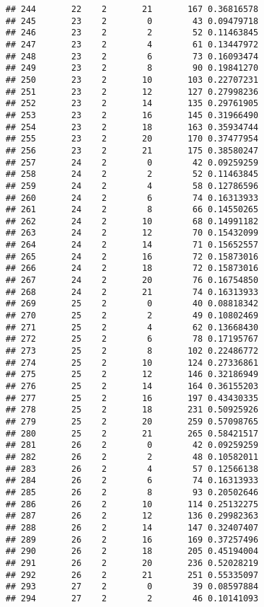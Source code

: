 \documentclass[
]{article}
\begin{document}
\begin{verbatim}
## 244       22    2       21       167 0.36816578
## 245       23    2        0        43 0.09479718
## 246       23    2        2        52 0.11463845
## 247       23    2        4        61 0.13447972
## 248       23    2        6        73 0.16093474
## 249       23    2        8        90 0.19841270
## 250       23    2       10       103 0.22707231
## 251       23    2       12       127 0.27998236
## 252       23    2       14       135 0.29761905
## 253       23    2       16       145 0.31966490
## 254       23    2       18       163 0.35934744
## 255       23    2       20       170 0.37477954
## 256       23    2       21       175 0.38580247
## 257       24    2        0        42 0.09259259
## 258       24    2        2        52 0.11463845
## 259       24    2        4        58 0.12786596
## 260       24    2        6        74 0.16313933
## 261       24    2        8        66 0.14550265
## 262       24    2       10        68 0.14991182
## 263       24    2       12        70 0.15432099
## 264       24    2       14        71 0.15652557
## 265       24    2       16        72 0.15873016
## 266       24    2       18        72 0.15873016
## 267       24    2       20        76 0.16754850
## 268       24    2       21        74 0.16313933
## 269       25    2        0        40 0.08818342
## 270       25    2        2        49 0.10802469
## 271       25    2        4        62 0.13668430
## 272       25    2        6        78 0.17195767
## 273       25    2        8       102 0.22486772
## 274       25    2       10       124 0.27336861
## 275       25    2       12       146 0.32186949
## 276       25    2       14       164 0.36155203
## 277       25    2       16       197 0.43430335
## 278       25    2       18       231 0.50925926
## 279       25    2       20       259 0.57098765
## 280       25    2       21       265 0.58421517
## 281       26    2        0        42 0.09259259
## 282       26    2        2        48 0.10582011
## 283       26    2        4        57 0.12566138
## 284       26    2        6        74 0.16313933
## 285       26    2        8        93 0.20502646
## 286       26    2       10       114 0.25132275
## 287       26    2       12       136 0.29982363
## 288       26    2       14       147 0.32407407
## 289       26    2       16       169 0.37257496
## 290       26    2       18       205 0.45194004
## 291       26    2       20       236 0.52028219
## 292       26    2       21       251 0.55335097
## 293       27    2        0        39 0.08597884
## 294       27    2        2        46 0.10141093

\end{verbatim}
\end{document}
